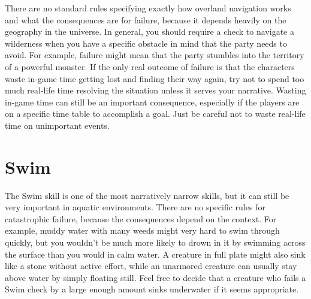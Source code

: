     There are no standard rules specifying exactly how overland navigation works and what the consequences are for failure, because it depends heavily on the geography in the universe.
    In general, you should require a check to navigate a wilderness when you have a specific obstacle in mind that the party needs to avoid.
    For example, failure might mean that the party stumbles into the territory of a powerful monster.
    If the only real outcome of failure is that the characters waste in-game time getting lost and finding their way again, try not to spend too much real-life time resolving the situation unless it serves your narrative.
    Wasting in-game time can still be an important consequence, especially if the players are on a specific time table to accomplish a goal.
    Just be careful not to waste real-life time on unimportant events.

\section{Swim}
  The Swim skill is one of the most narratively narrow skills, but it can still be very important in aquatic environments.
  There are no specific rules for catastrophic failure, because the consequences depend on the context.
  For example, muddy water with many weeds might very hard to swim through quickly, but you wouldn't be much more likely to drown in it by swimming across the surface than you would in calm water.
  A creature in full plate might also sink like a stone without active effort, while an unarmored creature can usually stay above water by simply floating still.
  Feel free to decide that a creature who fails a Swim check by a large enough amount sinks underwater if it seems appropriate.
